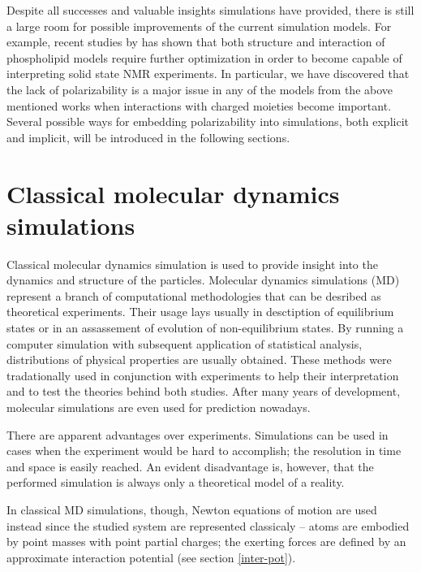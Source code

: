Despite all successes and valuable insights simulations have provided, 
there is still a large room for possible improvements of the current simulation models. 
For example, recent studies by \citet{botan15, catte16} has shown 
that both structure and interaction of phospholipid models require further optimization 
in order to become capable of interpreting solid state NMR experiments. 
In particular, we have discovered that 
the lack of polarizability is a major issue in any of the models 
from the above mentioned works \citep{botan15, catte16}
when interactions with charged moieties become important. 
Several possible ways for embedding polarizability into simulations, both explicit and implicit, 
will be introduced in the following sections. 





\section{Classical molecular dynamics simulations}

Classical molecular dynamics simulation is used to provide insight into the dynamics and structure of the particles. 
  Molecular dynamics simulations (MD) represent a branch of computational methodologies that can be desribed as theoretical experiments. 
  Their usage lays usually in desctiption of equilibrium states or in an assassement of evolution of non-equilibrium states.
  By running a computer simulation with subsequent application of statistical analysis, distributions of physical properties are usually obtained. 
  These methods were tradationally used in conjunction with experiments to help their interpretation and to test the theories behind both studies. After many years of development, molecular simulations are even used for prediction nowadays.

  There are apparent advantages over experiments. Simulations can be used in cases when the experiment would be hard to accomplish; the resolution in time and space is easily reached. An evident disadvantage is, however, that the performed simulation is always only a theoretical model of a reality. 


In classical MD simulations, though, Newton equations of motion are used instead since the studied system are represented classicaly -- atoms are embodied by point masses with point partial charges; the exerting forces are defined by an approximate interaction potential (see section \ref{inter-pot}). 


